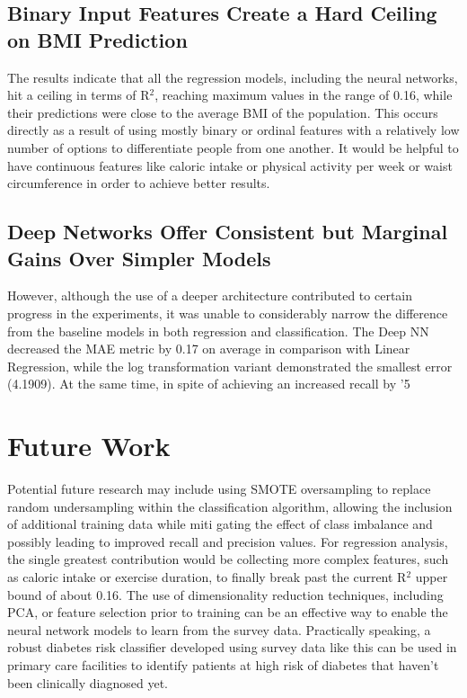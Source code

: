 \documentclass{article}
\begin{document}
\subsection{Binary Input Features Create a Hard Ceiling on BMI Prediction}

The results indicate that all the regression models, including the neural networks, hit a ceiling in terms of R$^2$, reaching maximum values in the range of 0.16, while their predictions were close to the average BMI of the population. This occurs directly as a result of using mostly binary or ordinal features with a relatively low number of options to differentiate people from one another. It would be helpful to have continuous features like caloric intake or physical activity per week or waist circumference in order to achieve better results.

\subsection{Deep Networks Offer Consistent but Marginal Gains Over Simpler Models}

However, although the use of a deeper architecture contributed to certain progress in the experiments, it was unable to considerably narrow the difference from the baseline models in both regression and classification. The Deep NN decreased the MAE metric by 0.17 on average in comparison with Linear Regression, while the log transformation variant demonstrated the smallest error (4.1909). At the same time, in spite of achieving an increased recall by '5%

\section{Future Work}

Potential future research may include using SMOTE oversampling to replace random undersampling within the classification algorithm, allowing the inclusion of additional training data while miti gating the effect of class imbalance and possibly leading to improved recall and precision values. For regression analysis, the single greatest contribution would be collecting more complex features, such as caloric intake or exercise duration, to finally break past the current R$^2$ upper bound of about 0.16. The use of dimensionality reduction techniques, including PCA, or feature selection prior to training can be an effective way to enable the neural network models to learn from the survey data. Practically speaking, a robust diabetes risk classifier developed using survey data like this can be used in primary care facilities to identify patients at high risk of diabetes that haven't been clinically diagnosed yet.
\end{document}
